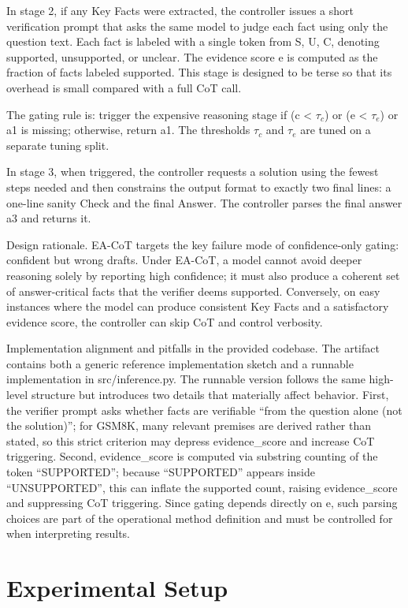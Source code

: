 \documentclass[journal,article,submit,pdftex,moreauthors]{Definitions/mdpi}
\begin{document}
In stage 2, if any Key Facts were extracted, the controller issues a short verification prompt that asks the same model to judge each fact using only the question text. Each fact is labeled with a single token from {S, U, C}, denoting supported, unsupported, or unclear. The evidence score e is computed as the fraction of facts labeled supported. This stage is designed to be terse so that its overhead is small compared with a full CoT call.

The gating rule is: trigger the expensive reasoning stage if (c < $\tau_c$) or (e < $\tau_e$) or a1 is missing; otherwise, return a1. The thresholds $\tau_c$ and $\tau_e$ are tuned on a separate tuning split.

In stage 3, when triggered, the controller requests a solution using the fewest steps needed and then constrains the output format to exactly two final lines: a one-line sanity Check and the final Answer. The controller parses the final answer a3 and returns it.

Design rationale. EA-CoT targets the key failure mode of confidence-only gating: confident but wrong drafts. Under EA-CoT, a model cannot avoid deeper reasoning solely by reporting high confidence; it must also produce a coherent set of answer-critical facts that the verifier deems supported. Conversely, on easy instances where the model can produce consistent Key Facts and a satisfactory evidence score, the controller can skip CoT and control verbosity.

Implementation alignment and pitfalls in the provided codebase. The artifact contains both a generic reference implementation sketch and a runnable implementation in src/inference.py. The runnable version follows the same high-level structure but introduces two details that materially affect behavior. First, the verifier prompt asks whether facts are verifiable “from the question alone (not the solution)”; for GSM8K, many relevant premises are derived rather than stated, so this strict criterion may depress evidence\_score and increase CoT triggering. Second, evidence\_score is computed via substring counting of the token “SUPPORTED”; because “SUPPORTED” appears inside “UNSUPPORTED”, this can inflate the supported count, raising evidence\_score and suppressing CoT triggering. Since gating depends directly on e, such parsing choices are part of the operational method definition and must be controlled for when interpreting results.

\section{Experimental Setup}
\end{document}
